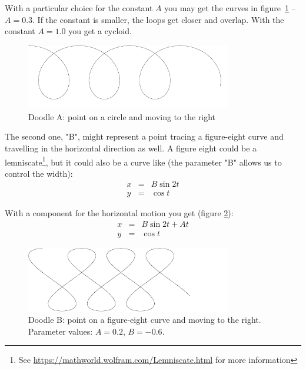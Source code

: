 \documentclass[onecolumn]{article}
\begin{document}
With a particular choice for the constant $A$ you may get the curves in figure~\ref{doodle_a} -- $A = 0.3$. If the constant is smaller, the
loops get closer and overlap. With the constant $A = 1.0$ you get a cycloid.

\begin{figure}[H]
\caption{Doodle A: point on a circle and moving to the right}
\label{doodle_a}
\begin{center}
\includegraphics[width=0.8\textwidth]{doodle_a.pdf}
\end{center}
\end{figure}

The second one, "B", might represent a point tracing a figure-eight curve and travelling in the horizontal direction as well. A figure eight
could be a lemniscate\footnote{See \url{https://mathworld.wolfram.com/Lemniscate.html} for more information}, but it could also be a curve
like (the parameter "B" allows us to control the width):
\begin{eqnarray}
\nonumber x &=& B \sin 2t \\
\nonumber y &=& \cos t
\end{eqnarray}

With a component for the horizontal motion you get (figure \ref{doodle_b}):
\begin{eqnarray}
\nonumber x &=& B \sin 2t + At\\
\nonumber y &=& \cos t
\end{eqnarray}

\begin{figure}[H]
\caption{Doodle B: point on a figure-eight curve and moving to the right. Parameter values: $A = 0.2$, $B = -0.6$.}
\label{doodle_b}
\begin{center}
\includegraphics[width=0.8\textwidth]{doodle_b.pdf}
\end{center}
\end{figure}
\end{document}
